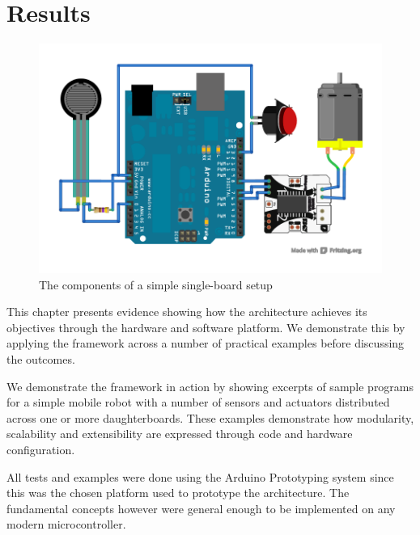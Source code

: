 \chapter{Results} 
\label{chap:results}

\begin{figure}
  \begin{center}
    \includegraphics[width=1.0\columnwidth]{Figures/simple-example.pdf}
    \caption{The components of a simple single-board \xten setup} \label{fig:singleboard}
  \end{center}
\end{figure}

This chapter presents evidence showing how the \xten architecture achieves its objectives through the hardware and software platform. We demonstrate this by applying the framework across a number of practical examples before discussing the outcomes.

 We demonstrate the framework in action by showing excerpts of sample programs for a simple mobile robot with a number of sensors and actuators distributed across one or more daughterboards. These examples demonstrate how modularity, scalability and extensibility are expressed through code and hardware configuration.
 
All tests and examples were done using the Arduino Prototyping system since this was the chosen platform used to prototype the \xten architecture. The fundamental concepts however were general enough to be implemented on any modern microcontroller.

